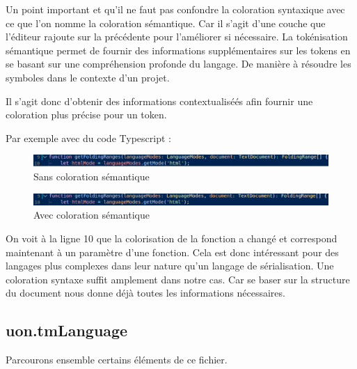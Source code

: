 \documentclass[
    iict, %
    il, %
]{heig-tb}
\begin{document}
Un point important et qu'il ne faut pas confondre la coloration syntaxique avec ce que l'on nomme la coloration sémantique. Car il s'agit d'une couche que l'éditeur rajoute sur la précédente pour l'améliorer si nécessaire.
La tokénisation sémantique permet de fournir des informations supplémentaires sur les tokens en se basant sur une compréhension profonde du langage.
De manière à résoudre les symboles dans le contexte d'un projet.

Il s'agit donc d'obtenir des informations contextualiséés afin fournir une coloration plus précise pour un token.

Par exemple avec du code Typescript :

\begin{figure}[!h]
    \begin{center}
        \includegraphics[width=15cm]{assets/figures/semantic-coloration-without.png}
    \end{center}
    \caption[Sans coloration sémantique]{\label{semantic-coloration-without} Sans coloration sémantique}
\end{figure}

\begin{figure}[!h]
    \begin{center}
        \includegraphics[width=15cm]{assets/figures/semantic-coloration-with.png}
    \end{center}
    \caption[Sans coloration sémantique ]{\label{semantic-coloration-with} Avec coloration sémantique }
\end{figure}

On voit à la ligne 10 que la colorisation de la fonction a changé et correspond maintenant à un paramètre d'une fonction.
Cela est donc intéressant pour des langages plus complexes dans leur nature qu'un langage de sérialisation. Une coloration syntaxe suffit amplement dans notre cas.
Car se baser sur la structure du document nous donne déjà toutes les informations nécessaires.

\subsection{uon.tmLanguage}

Parcourons ensemble certains éléments de ce fichier.
\end{document}
